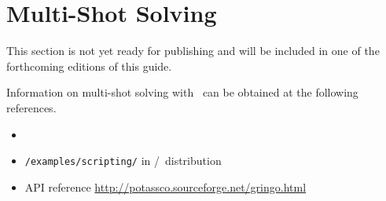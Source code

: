 \section{Multi-Shot Solving}\label{sec:multi}

This section is not yet ready for publishing
and will be included in one of the forthcoming editions of this guide.

Information on multi-shot solving with \clingo\ can be obtained at the following references.

\begin{itemize}
\item \cite{gekakasc14b,gekaobsc15a}
\item \texttt{/examples/scripting/} in \gringo/\clingo\ distribution
\item API reference \url{http://potassco.sourceforge.net/gringo.html}
\end{itemize}

